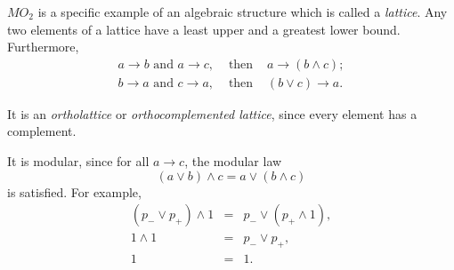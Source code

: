 \documentclass[%
  preprint,
 showpacs,
 showkeys,
 preprintnumbers,
 amsmath,amssymb,
 aps,
 rmp,
  longbibliography,
 ]{revtex4-1}
\begin{document}
$MO_2$ is a specific example of an algebraic structure which is called a
{\em lattice}.
Any two elements of a lattice have a least upper and a greatest lower
bound. Furthermore,
\begin{eqnarray*}
a\rightarrow b
\textrm{ and }
a \rightarrow c, &\textrm{ then }&
a
\rightarrow
(b\wedge c);\\
b
\rightarrow
a
\textrm{ and }
c
\rightarrow
a, &\textrm{ then }&
(b\vee c)
\rightarrow
a.
\end{eqnarray*}

It is an {\em ortholattice} or {\em orthocomplemented lattice}, since
every element has a complement.

It is modular, since for all $a\rightarrow c$, the modular law
\label{l-modular}
$$
 (a\vee b)\wedge c= a\vee (b \wedge c)
$$
is satisfied. For example,
\begin{eqnarray*}
(p_-\vee p_+)\wedge 1&=& p_-\vee (p_+ \wedge 1),\\
            1\wedge 1&=& p_-\vee p_+,\\
             1&=&1.
\end{eqnarray*}
\end{document}
